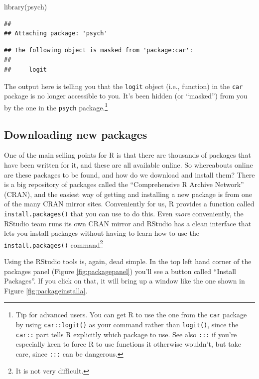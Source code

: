 \documentclass[
]{book}
\newenvironment{Shaded}{\begin{snugshade}}{\end{snugshade}}
\newcommand{\FunctionTok}[1]{\textcolor[rgb]{0.00,0.00,0.00}{#1}}
\newcommand{\NormalTok}[1]{#1}
\begin{document}
\begin{Shaded}
\begin{Highlighting}[]
\FunctionTok{library}\NormalTok{(psych)}
\end{Highlighting}
\end{Shaded}

\begin{verbatim}
## 
## Attaching package: 'psych'
\end{verbatim}

\begin{verbatim}
## The following object is masked from 'package:car':
## 
##     logit
\end{verbatim}

The output here is telling you that the \texttt{logit} object (i.e., function) in the \texttt{car} package is no longer accessible to you. It's been hidden (or ``masked'') from you by the one in the \texttt{psych} package.\footnote{Tip for advanced users. You can get R to use the one from the \texttt{car} package by using \texttt{car::logit()} as your command rather than \texttt{logit()}, since the \texttt{car::} part tells R explicitly which package to use. See also \texttt{:::} if you're especially keen to force R to use functions it otherwise wouldn't, but take care, since \texttt{:::} can be dangerous.}

\hypertarget{downloading-new-packages}{%
\subsection{Downloading new packages}\label{downloading-new-packages}}

One of the main selling points for R is that there are thousands of packages that have been written for it, and these are all available online. So whereabouts online are these packages to be found, and how do we download and install them? There is a big repository of packages called the ``Comprehensive R Archive Network'' (CRAN), and the easiest way of getting and installing a new package is from one of the many CRAN mirror sites. Conveniently for us, R provides a function called \texttt{install.packages()} that you can use to do this. Even \emph{more} conveniently, the RStudio team runs its own CRAN mirror and RStudio has a clean interface that lets you install packages without having to learn how to use the \texttt{install.packages()} command\footnote{It is not very difficult.}

Using the RStudio tools is, again, dead simple. In the top left hand corner of the packages panel (Figure \ref{fig:packagepanel}) you'll see a button called ``Install Packages''. If you click on that, it will bring up a window like the one shown in Figure \ref{fig:packageinstalla}.
\end{document}
